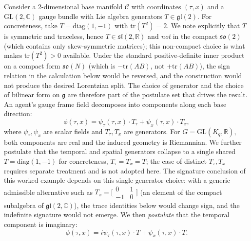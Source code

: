 \documentclass[11pt]{article}
\begin{document}
Consider a 2-dimensional base manifold $\mathcal{C}$ with coordinates $(\tau, x)$ and a $\mathrm{GL}(2, \mathbb{C})$ gauge bundle with Lie algebra generators $T \in \mathfrak{gl}(2)$. For concreteness, take $T = \mathrm{diag}(1, -1)$ with $\mathrm{tr}(T^2) = 2$. We note explicitly that $T$ is symmetric and traceless, hence $T \in \mathfrak{sl}(2, \mathbb{R})$ and \emph{not} in the compact $\mathfrak{so}(2)$ (which contains only skew-symmetric matrices); this non-compact choice is what makes $\mathrm{tr}(T^2) > 0$ available. Under the standard positive-definite inner product on a compact form $\mathfrak{so}(N)$ (which is $-\mathrm{tr}(AB)$, not $+\mathrm{tr}(AB)$), the sign relation in the calculation below would be reversed, and the construction would not produce the desired Lorentzian split. The choice of generator and the choice of bilinear form on $\mathfrak{g}$ are therefore part of the postulate set that drives the result. An agent's gauge frame field decomposes into components along each base direction:
\begin{equation}
\phi(\tau, x) = \psi_\tau(\tau, x) \cdot T_\tau + \psi_x(\tau, x) \cdot T_x,
\end{equation}
where $\psi_\tau, \psi_x$ are scalar fields and $T_\tau, T_x$ are generators. For $G = \mathrm{GL}(K_q, \mathbb{R})$, both components are real and the induced geometry is Riemannian. We further postulate that the temporal and spatial generators collapse to a single shared $T = \mathrm{diag}(1, -1)$ for concreteness, $T_\tau = T_x = T$; the case of distinct $T_\tau, T_x$ requires separate treatment and is not adopted here. The signature conclusion of this worked example depends on this single-generator choice: with a generic admissible alternative such as $T_x = \bigl[\begin{smallmatrix} 0 & 1 \\ -1 & 0 \end{smallmatrix}\bigr]$ (an element of the compact subalgebra of $\mathfrak{gl}(2, \mathbb{C})$), the trace identities below would change sign, and the indefinite signature would not emerge. We then \emph{postulate} that the temporal component is imaginary:
\begin{equation}
\phi(\tau, x) = i\psi_\tau(\tau, x) \cdot T + \psi_x(\tau, x) \cdot T.
\label{eq:complex_gauge_frame}
\end{equation}
\end{document}
